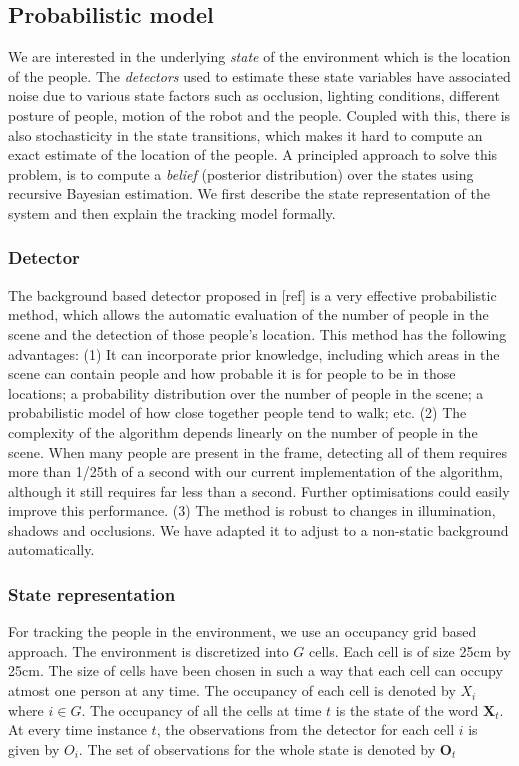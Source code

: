 \subsection{Probabilistic model}

We are interested in the underlying \textit{state} of the environment which is the location of the people. The \textit{detectors} used to estimate these state variables have associated noise due to various state factors such as occlusion, lighting conditions, different posture of people, motion of the robot and the people. Coupled with this, there is also stochasticity in the state transitions, which makes it hard to compute an exact estimate of the location of the people. A principled approach to solve this problem, is to compute a \textit{belief} (posterior distribution) over the states using recursive Bayesian estimation. We first describe the state representation of the system and then explain the tracking model formally.

\subsubsection{Detector}
The background based detector proposed in [ref] is a very effective probabilistic method, which allows the automatic evaluation of the number of people in the scene and the detection of those people’s location. This method has the following advantages: (1) It can incorporate prior knowledge, including which areas in the scene can contain people and how probable it is for people to be in those locations; a probability distribution over the number of people in the scene; a probabilistic model of how close
together people tend to walk; etc. (2) The complexity of the algorithm depends linearly on the number of people in the scene. When many people are present in the frame, detecting all of them requires
more than 1/25th of a second with our current implementation of the algorithm, although it still requires far less than a second. Further optimisations could easily improve this performance. (3) The method is robust to changes in illumination, shadows and occlusions. We have adapted it to adjust to a non-static background automatically.

\subsubsection{State representation}

For tracking the people in the environment, we use an occupancy grid based approach. The environment is discretized into $G$ cells. Each cell is of size 25cm by 25cm. The size of cells have been chosen in such a way that each cell can occupy atmost one person at any time. The occupancy of each cell is denoted by $X_{i}$ where $i \in G$. The occupancy of all the cells at time $t$ is the state of the word $\textbf{X}_{t}$. At every time instance $t$, the observations from the detector for each cell $i$ is given by $O_{i}$. The set of observations for the whole state is denoted by $\textbf{O}_{t}$ 

